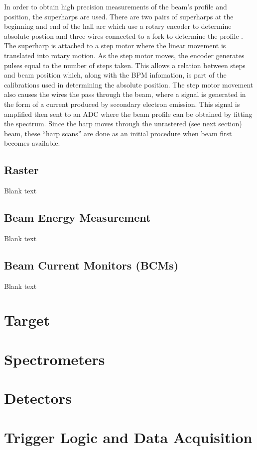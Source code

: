 In order to obtain high precision measurements of the beam's profile and
position, the superharps are used. There are two pairs of superharps at
the beginning and end of the hall arc which use a rotary encoder to
determine absolute postion and three wires connected to a fork to
determine the profile \cite{yan_superharp_1995}. The superharp is
attached to a step motor where the linear movement is translated into
rotary motion. As the step motor moves, the encoder generates pulses
equal to the number of steps taken. This allows a relation between steps
and beam position which, along with the BPM infomation, is part of the
calibrations used in determining the absolute position. The step motor
movement also causes the wires the pass through the beam, where a signal
is generated in the form of a current produced by secondary electron
emission. This signal is amplified then sent to an ADC where the beam
profile can be obtained by fitting the spectrum. Since the harp moves
through the unrastered (see next section) beam, these ``harp scans'' are
done as an initial procedure when beam first becomes available.

\hypertarget{raster}{%
\subsection{Raster}\label{raster}}

Blank text

\hypertarget{beam-energy-measurement}{%
\subsection{Beam Energy Measurement}\label{beam-energy-measurement}}

Blank text

\hypertarget{beam-current-monitors-bcms}{%
\subsection{Beam Current Monitors
(BCMs)}\label{beam-current-monitors-bcms}}

Blank text

\hypertarget{Section-4.4}{%
\section{Target}\label{Section-4.4}}

\hypertarget{Section-4.5}{%
\section{Spectrometers}\label{Section-4.5}}

\hypertarget{Section-4.6}{%
\section{Detectors}\label{Section-4.6}}

\hypertarget{Section-4.7}{%
\section{Trigger Logic and Data Acquisition}\label{Section-4.7}}


